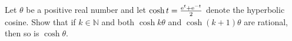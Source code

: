 \documentclass{article}
\begin{document}
	\setlength{\parindent}{0pt}
	Let $\theta$ be a positive real number and let $\cosh t=\frac{\textup{e}^t+\textup{e}^{-t}}{2}$ denote the hyperbolic cosine. Show that if $k\in \mathbb{N}$ and both $\cosh k\theta$ and $\cosh(k+1)\theta$ are rational, then so is $\cosh \theta$.
\end{document}
